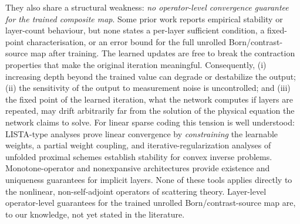 \documentclass[journal,cmes,article,submit,moreauthors,pdftex]{Definitions/tsp}
\begin{document}
They also share a structural weakness: \emph{no operator-level convergence guarantee for the trained composite map}. Some prior work reports empirical stability or layer-count behaviour, but none states a per-layer sufficient condition, a fixed-point characterisation, or an error bound for the full unrolled Born/contrast-source map after training. The learned updates are free
to break the contraction properties that make the original iteration meaningful. Consequently,
(i) increasing depth beyond the trained value can degrade or destabilize the output;
(ii) the sensitivity of the output to measurement noise is uncontrolled; and (iii) the fixed
point of the learned iteration, what the network computes if layers are repeated, may
drift arbitrarily far from the solution of the physical equation the network claims to solve.
For linear sparse coding this tension is well understood: LISTA-type analyses
\cite{lista, listacp, alista} prove linear convergence by \emph{constraining} the learnable
weights, a partial weight coupling, and iterative-regularization analyses of unfolded proximal
schemes \cite{cui_reg} establish stability for convex inverse problems. Monotone-operator and
nonexpansive architectures \cite{sherry_nonexp, mondeq} provide existence and uniqueness
guarantees for implicit layers. None of these tools applies directly to the nonlinear,
non-self-adjoint operators of scattering theory. Layer-level operator-level guarantees for the
trained unrolled Born/contrast-source map are, to our knowledge, not yet stated in the literature.
\end{document}
